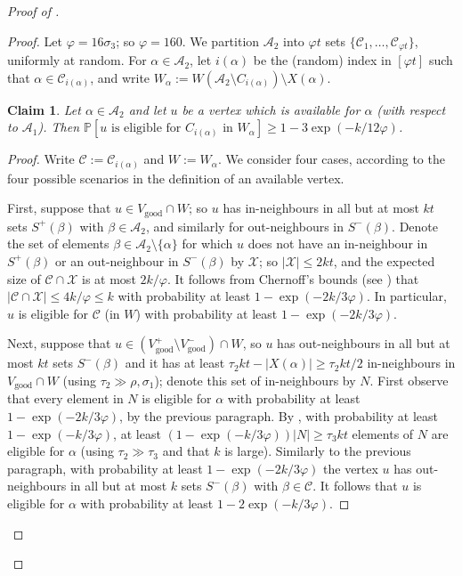 \documentclass[english]{article}
\theoremstyle{plain}
\newtheorem{claim}[theorem]{Claim}
\theoremstyle{remark}
\def\C{\mathcal{C}}
\def\X{\mathcal{X}}
\let\phi\varphi
\def \Sp {S^+}
\def \Sm {S^-}
\def \Vgp {V_{\good}^+}
\def \Vgp {V_{\good}^+}
\def \Vgm {V_{\good}^-}
\def \Vg {V_{\good}}
\def \Vgm {V_{\good}^-}
\renewcommand{\Pr}{\mathbb{P}}
\newcommand{\A}{\mathcal{A}}
\DeclareMathOperator{\good}{good}
\begin{document}
\begin{proof}[Proof of ]
		\begin{proof}
			\def \Wa {W_{\alpha}}
			Let $\phi = 16\sigma_3$; so $\phi = 160$.
			We partition $\A_2$ into $\phi t$ sets $\{\C_1, \ldots, \C_{\phi t}\}$, uniformly at random. For $\alpha \in \A_2$, let $i(\alpha)$ be the (random) index in $[\phi t]$ such that $\alpha \in \C_{i(\alpha)}$, and write $\Wa := W(\A_2 \setminus C_{i(\alpha)}) \setminus X(\alpha)$.

			\begin{claim} \label{claim:vertex-eligible}
				Let $\alpha \in \A_2$ and let $u$ be a vertex which is available for $\alpha$ (with respect to $\A_1$). Then $\Pr[\text{$u$ is eligible for $C_{i(\alpha)}$ in $\Wa$}] \ge 1 - 3\exp(-k/12\phi)$.
			\end{claim}

			\begin{proof}
				Write $\C := \C_{i(\alpha)}$ and $W := \Wa$. 
				We consider four cases, according to the four possible scenarios in the definition of an available vertex.

				First, suppose that $u \in \Vg \cap W$; so $u$ has in-neighbours in all but at most $kt$ sets $\Sp(\beta)$ with $\beta \in \A_2$, and similarly for out-neighbours in $\Sm(\beta)$. Denote the set of elements $\beta \in \A_2 \setminus \{\alpha\}$ for which $u$ does not have an in-neighbour in $\Sp(\beta)$ or an out-neighbour in $\Sm(\beta)$ by $\X$; so $|\X| \le 2kt$, and the expected size of $\C \cap \X$ is at most $2k/\phi$. It follows from Chernoff's bounds (see ) that $|\C \cap \X| \le 4k / \phi \le k$ with probability at least $1 - \exp(-2k/3\phi)$. In particular, $u$ is eligible for $\C$ (in $W$) with probability at least $1 - \exp(-2k/3\phi)$. 

				Next, suppose that $u \in (\Vgp \setminus \Vgm) \cap W$, so $u$ has out-neighbours in all but at most $kt$ sets $\Sm(\beta)$ and it has at least $\tau_2 kt - |X(\alpha)| \ge \tau_2 kt/2$ in-neighbours in $\Vg \cap W$ (using $\tau_2 \gg \rho, \sigma_1$); denote this set of in-neighbours by $N$. First observe that every element in $N$ is eligible for $\alpha$ with probability at least $1 - \exp(-2k/3\phi)$, by the previous paragraph. By , with probability at least $1 - \exp(-k/3\phi)$, at least $(1 - \exp(-k/3\phi))|N| \ge \tau_3 kt$ elements of $N$ are eligible for $\alpha$ (using $\tau_2 \gg \tau_3$ and that $k$ is large). Similarly to the previous paragraph, with probability at least $1 - \exp(-2k/3\phi)$ the vertex $u$ has out-neighbours in all but at most $k$ sets $\Sm(\beta)$ with $\beta \in \C$. It follows that $u$ is eligible for $\alpha$ with probability at least $1 - 2\exp(-k/3\phi)$. 


\end{proof}
\end{proof}
\end{proof}
\end{document}
